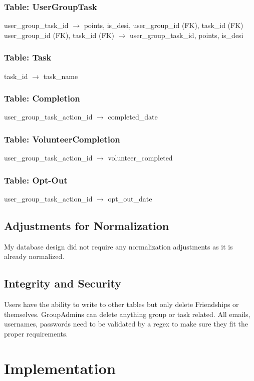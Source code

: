 \documentclass[11pt, a4paper]{report}
\begin{document}
\subsection{Table: UserGroupTask}
 user\_group\_task\_id $\rightarrow$ points, is\_desi, user\_group\_id (FK), task\_id (FK)\\
 user\_group\_id (FK), task\_id (FK) $\rightarrow$ user\_group\_task\_id, points, is\_desi
 
 \subsection{Table: Task}
 task\_id $\rightarrow$ task\_name
 
 \subsection{Table: Completion}
 user\_group\_task\_action\_id $\rightarrow$ completed\_date
 
 \subsection{Table: VolunteerCompletion}
 user\_group\_task\_action\_id $\rightarrow$ volunteer\_completed
 
 \subsection{Table: Opt-Out}
  user\_group\_task\_action\_id $\rightarrow$ opt\_out\_date

\section{Adjustments for Normalization}
My database design did not require any normalization adjustments as it is already normalized.

\section{Integrity and Security}
Users have the ability to write to other tables but only delete Friendships or themselves. GroupAdmins can delete anything group or task related. All emails, usernames, passwords need to be validated by a regex to make sure they fit the proper requirements.

\chapter{Implementation}
\end{document}

